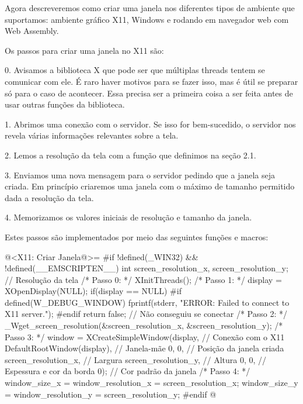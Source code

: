 
Agora descreveremos como criar uma janela nos diferentes tipos de
ambiente que suportamos: ambiente gráfico X11, Windows e rodando em
navegador web com Web Assembly.


Os passos para criar uma janela no X11 são:

0. Avisamos a biblioteca X que pode ser que múltiplas threads tentem
se comunicar com ele. É raro haver motivos para se fazer isso, mas é
útil se preparar só para o caso de acontecer. Essa precisa ser a
primeira coisa a ser feita antes de usar outras funções da biblioteca.

1. Abrimos uma conexão com o servidor. Se isso for bem-sucedido, o
servidor nos revela várias informações relevantes sobre a tela.

2. Lemos a resolução da tela com a função que definimos na seção 2.1.

3. Enviamos uma nova mensagem para o servidor pedindo que a janela
seja criada. Em princípio criaremos uma janela com o máximo de tamanho
permitido dada a resolução da tela.

4. Memorizamos os valores iniciais de resolução e tamanho da janela.

Estes passos são implementados por meio das seguintes funções e
macros:

\iniciocodigo
@<X11: Criar Janela@>=
#if !defined(_WIN32) && !defined(__EMSCRIPTEN__)
int screen_resolution_x, screen_resolution_y; // Resolução da tela
/* Passo 0: */
XInitThreads();
/* Passo 1: */
display = XOpenDisplay(NULL);
if(display == NULL){
#if defined(W_DEBUG_WINDOW)
  fprintf(stderr, "ERROR: Failed to connect to X11 server.\n");
#endif
  return false; // Não conseguiu se conectar
}
/* Passo 2: */
_Wget_screen_resolution(&screen_resolution_x, &screen_resolution_y);
/* Passo 3: */
window = XCreateSimpleWindow(display, // Conexão com o X11
                             DefaultRootWindow(display), // Janela-mãe
                             0, 0, // Posição da janela criada
                             screen_resolution_x, // Largura
                             screen_resolution_y, // Altura
                             0, 0, // Espessura e cor da borda
                             0); // Cor padrão da janela
/* Passo 4: */
window_size_x = window_resolution_x = screen_resolution_x;
window_size_y = window_resolution_y = screen_resolution_y;
#endif
@
\fimcodigo

